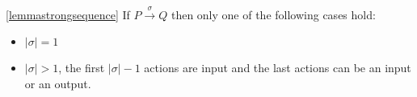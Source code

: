 \begin{lemma}\ref{lemmastrongsequence}
  If $P\xrightarrow{\sigma} Q$ then only one of the following cases hold: 
  \begin{itemize}
    \item 
      $|\sigma|=1$
    \item
      $|\sigma|>1$, the first $|\sigma|-1$ actions are input and the last actions can be an input or an output.
  \end{itemize}
\end{lemma}




